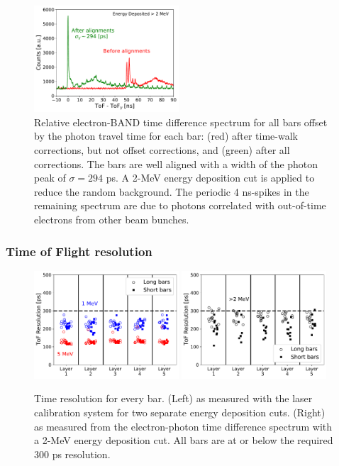 \documentclass[review,number,sort&compress]{elsarticle}
\begin{document}
\begin{figure}[tbh!]
	\centering
		\includegraphics[width=0.48\textwidth]{fig21-alignment.pdf}
                \caption{Relative electron-BAND time difference
                  spectrum for all bars offset by the photon travel
                  time for each bar: (red) after time-walk
                  corrections, but not offset corrections, and (green)
                  after all corrections. The bars are well
                  aligned with a width of the photon peak of
                  $\sigma=294$ \si{\pico\s}. A 2-\si{\mega\electronvolt} energy deposition cut is
                  applied to reduce the random background.  The
                  periodic 4 \si{\nano\s}-spikes in the remaining
                  spectrum are due to photons correlated with out-of-time
                  electrons from other beam bunches.}
	\label{fig:final_offset}
\end{figure}

\subsubsection{Time of Flight resolution}
\label{sec:tofresolution}
\begin{figure}[tbh!]
	\centering
			\includegraphics[width=0.48\textwidth]{fig22a-laserres.pdf}
		\includegraphics[width=0.48\textwidth]{fig22b-photonres.pdf}
	\caption{Time resolution for every bar. (Left) as measured
          with the laser calibration system for two separate energy
          deposition cuts. (Right) as measured
          from the electron-photon time difference spectrum with a
          2-\si{\mega\electronvolt} energy deposition cut. All bars
          are at or below the required 300 \si{\pico\s} resolution. }
	\label{fig:tof_resolution}
\end{figure}
\end{document}
